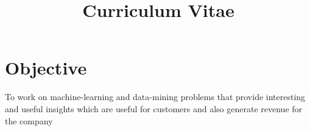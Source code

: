 \documentclass[11pt,a4paper,sans]{moderncv} %
\title{Curriculum Vitae}
\begin{document}
\makecvtitle %


\section{Objective}
To work on machine-learning and data-mining problems that provide interesting and useful insights which are useful for customers and also generate revenue for the company


\end{document}
